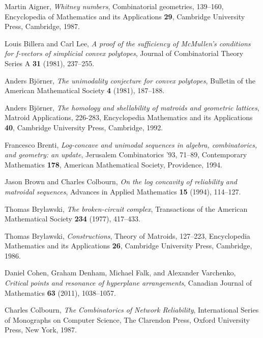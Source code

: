 \documentclass{compositio}
\theoremstyle{definition}
\theoremstyle{remark}
\begin{document}
\begin{thebibliography}{CDFV12}

 Martin Aigner,
			\emph{Whitney numbers}, Combinatorial geometries, 139--160, 
			Encyclopedia of Mathematics and its Applications {\bf 29}, Cambridge University Press, Cambridge, 1987. 
			
 Louis Billera and Carl Lee,
			\emph{A proof of the sufficiency of McMullen's conditions for f-vectors of simplicial convex polytopes}, 
			Journal of Combinatorial Theory Series A {\bf 31} (1981), 237--255. 

 Anders Bj\"orner,
			\emph{The unimodality conjecture for convex polytopes},
			Bulletin of the American Mathematical Society {\bf 4} (1981), 187--188.

 Anders Bj\"orner,
			\emph{The homology and shellability of matroids and geometric lattices},
			Matroid Applications, 226-283, 
			Encyclopedia Mathematics and its Applications {\bf 40}, Cambridge University Press, Cambridge, 1992.
			

 Francesco Brenti, 
			\emph{Log-concave and unimodal sequences in algebra, combinatorics, and geometry: an update},
			Jerusalem Combinatorics '93, 71--89,
			Contemporary Mathematics {\bf 178}, American Mathematical Society, Providence, 1994.

 Jason Brown and Charles Colbourn, 
			\emph{On the log concavity of reliability and matroidal sequences},
			Advances in Applied Mathematics {\bf 15} (1994), 114--127. 			
			
 Thomas Brylawski,
			\emph{The broken-circuit complex},
			Transactions of the American Mathematical Society {\bf 234} (1977),
			417--433.

 Thomas Brylawski, 
			\emph{Constructions}, Theory of Matroids, 127--223, 
			Encyclopedia Mathematics and its Applications {\bf 26}, Cambridge University Press, Cambridge, 1986. 

 Daniel Cohen, Graham Denham, Michael Falk, and Alexander Varchenko,
			\emph{Critical points and resonance of hyperplane arrangements},
			Canadian Journal of Mathematics {\bf 63} (2011), 1038--1057.

 Charles Colbourn,
			\emph{The Combinatorics of Network Reliability},
			International Series of Monographs on Computer Science, 
			The Clarendon Press, Oxford University Press, New York, 1987.


\end{thebibliography}
\end{document}
